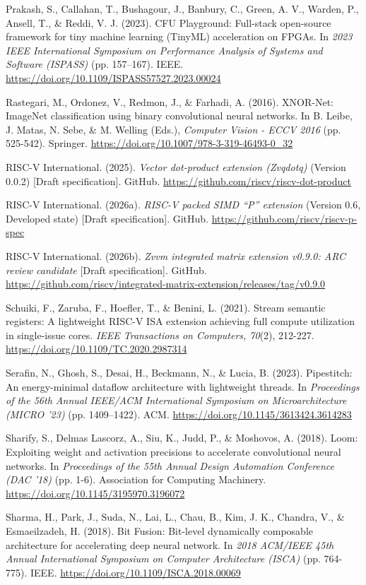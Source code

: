 \begin{apareferences}
Prakash, S., Callahan, T., Bushagour, J., Banbury, C., Green, A. V., Warden, P., Ansell, T., \& Reddi, V. J. (2023). CFU Playground: Full-stack open-source framework for tiny machine learning (TinyML) acceleration on FPGAs. In \emph{2023 IEEE International Symposium on Performance Analysis of Systems and Software (ISPASS)} (pp. 157–167). IEEE. \url{https://doi.org/10.1109/ISPASS57527.2023.00024}

Rastegari, M., Ordonez, V., Redmon, J., \& Farhadi, A. (2016). XNOR-Net: ImageNet classification using binary convolutional neural networks. In B. Leibe, J. Matas, N. Sebe, \& M. Welling (Eds.), \emph{Computer Vision - ECCV 2016} (pp. 525-542). Springer. \url{https://doi.org/10.1007/978-3-319-46493-0_32}

RISC-V International. (2025). \emph{Vector dot-product extension (Zvqdotq)} (Version 0.0.2) {[}Draft specification{]}. GitHub. \url{https://github.com/riscv/riscv-dot-product}

RISC-V International. (2026a). \emph{RISC-V packed SIMD “P” extension} (Version 0.6, Developed state) {[}Draft specification{]}. GitHub. \url{https://github.com/riscv/riscv-p-spec}

RISC-V International. (2026b). \emph{Zvvm integrated matrix extension v0.9.0: ARC review candidate} {[}Draft specification{]}. GitHub. \url{https://github.com/riscv/integrated-matrix-extension/releases/tag/v0.9.0}

Schuiki, F., Zaruba, F., Hoefler, T., \& Benini, L. (2021). Stream semantic registers: A lightweight RISC-V ISA extension achieving full compute utilization in single-issue cores. \emph{IEEE Transactions on Computers, 70}(2), 212-227. \url{https://doi.org/10.1109/TC.2020.2987314}

Serafin, N., Ghosh, S., Desai, H., Beckmann, N., \& Lucia, B. (2023). Pipestitch: An energy-minimal dataflow architecture with lightweight threads. In \emph{Proceedings of the 56th Annual IEEE/ACM International Symposium on Microarchitecture (MICRO '23)} (pp. 1409–1422). ACM. \url{https://doi.org/10.1145/3613424.3614283}

Sharify, S., Delmas Lascorz, A., Siu, K., Judd, P., \& Moshovos, A. (2018). Loom: Exploiting weight and activation precisions to accelerate convolutional neural networks. In \emph{Proceedings of the 55th Annual Design Automation Conference (DAC '18)} (pp. 1-6). Association for Computing Machinery. \url{https://doi.org/10.1145/3195970.3196072}

Sharma, H., Park, J., Suda, N., Lai, L., Chau, B., Kim, J. K., Chandra, V., \& Esmaeilzadeh, H. (2018). Bit Fusion: Bit-level dynamically composable architecture for accelerating deep neural network. In \emph{2018 ACM/IEEE 45th Annual International Symposium on Computer Architecture (ISCA)} (pp. 764-775). IEEE. \url{https://doi.org/10.1109/ISCA.2018.00069}


\end{apareferences}
